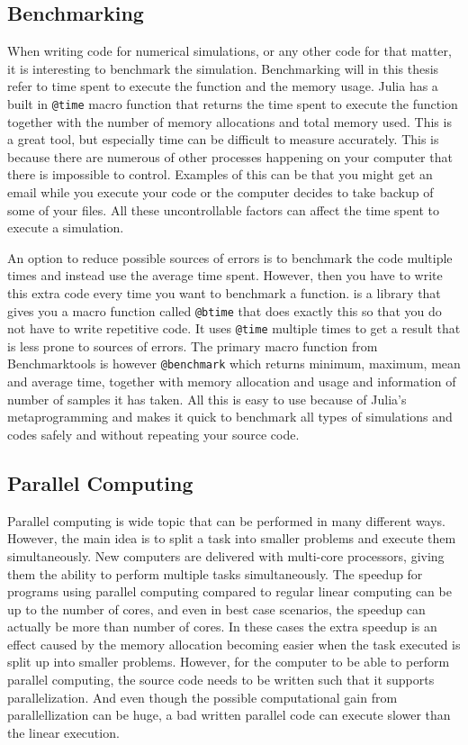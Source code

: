 \subsection{Benchmarking}
\label{sec:benchmarking}
When writing code for numerical simulations, or any other code for that matter, it is interesting to benchmark the simulation. Benchmarking will in this thesis refer to time spent to execute the function and the memory usage. Julia has a built in \texttt{@time} macro function \emph{\citep{@time}} that returns the time spent to execute the function together with the number of memory allocations and total memory used. This is a great tool, but especially time can be difficult to measure accurately. This is because there are numerous of other processes happening on your computer that there is impossible to control. Examples of this can be that you might get an email while you execute your code or the computer decides to take backup of some of your files. All these uncontrollable factors can affect the time spent to execute a simulation. 

An option to reduce possible sources of errors is to benchmark the code multiple times and instead use the average time spent. However, then you have to write this extra code every time you want to benchmark a function. \emph{\cite{BenchmarkTools}} is a library that gives you a macro function called \texttt{@btime} that does exactly this so that you do not have to write repetitive code. It uses \texttt{@time} multiple times to get a result that is less prone to sources of errors. The primary macro function from Benchmarktools is however \texttt{@benchmark} which returns minimum, maximum, mean and average time, together with memory allocation and usage and information of number of samples it has taken. All this is easy to use because of Julia's metaprogramming and makes it quick to benchmark all types of simulations and codes safely and without repeating your source code.

\subsection{Parallel Computing}
\label{sec:parallelComputing}
Parallel computing is wide topic that can be performed in many different ways. However, the main idea is to split a task into smaller problems and execute them simultaneously. New computers are delivered with multi-core processors, giving them the ability to perform multiple tasks simultaneously. The speedup for programs using parallel computing compared to regular linear computing can be up to the number of cores, and even in best case scenarios, the speedup can actually be more than number of cores. In these cases the extra speedup is an effect caused by the memory allocation becoming easier when the task executed is split up into smaller problems. However, for the computer to be able to perform parallel computing, the source code needs to be written such that it supports parallelization. And even though the possible computational gain from parallellization can be huge, a bad written parallel code can execute slower than the linear execution. 

